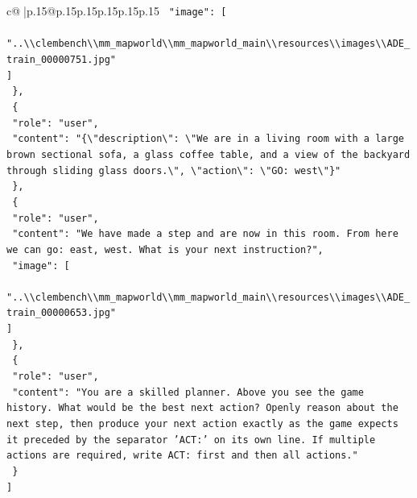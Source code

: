 \documentclass{article}
\begin{document}
{\begin{supertabular}{c@{$\;$}|p{.15\linewidth}@{}p{.15\linewidth}p{.15\linewidth}p{.15\linewidth}p{.15\linewidth}p{.15\linewidth}}
{{{\texttt{    "image": {[}} \\
\texttt{      "..\textbackslash{}\textbackslash{}clembench\textbackslash{}\textbackslash{}mm\_mapworld\textbackslash{}\textbackslash{}mm\_mapworld\_main\textbackslash{}\textbackslash{}resources\textbackslash{}\textbackslash{}images\textbackslash{}\textbackslash{}ADE\_train\_00000751.jpg"} \\
\texttt{    {]}} \\
\texttt{  \},} \\
\texttt{  \{} \\
\texttt{    "role": "user",} \\
\texttt{    "content": "\{\textbackslash{}"description\textbackslash{}": \textbackslash{}"We are in a living room with a large brown sectional sofa, a glass coffee table, and a view of the backyard through sliding glass doors.\textbackslash{}", \textbackslash{}"action\textbackslash{}": \textbackslash{}"GO: west\textbackslash{}"\}"} \\
\texttt{  \},} \\
\texttt{  \{} \\
\texttt{    "role": "user",} \\
\texttt{    "content": "We have made a step and are now in this room. From here we can go: east, west. What is your next instruction?",} \\
\texttt{    "image": {[}} \\
\texttt{      "..\textbackslash{}\textbackslash{}clembench\textbackslash{}\textbackslash{}mm\_mapworld\textbackslash{}\textbackslash{}mm\_mapworld\_main\textbackslash{}\textbackslash{}resources\textbackslash{}\textbackslash{}images\textbackslash{}\textbackslash{}ADE\_train\_00000653.jpg"} \\
\texttt{    {]}} \\
\texttt{  \},} \\
\texttt{  \{} \\
\texttt{    "role": "user",} \\
\texttt{    "content": "You are a skilled planner. Above you see the game history. What would be the best next action? Openly reason about the next step, then produce your next action exactly as the game expects it preceded by the separator 'ACT:' on its own line. If multiple actions are required, write ACT: first and then all actions."} \\
\texttt{  \}} \\
\texttt{{]}} \\
            }
        }
    }
     \\ \\


\end{supertabular}}
\end{document}
